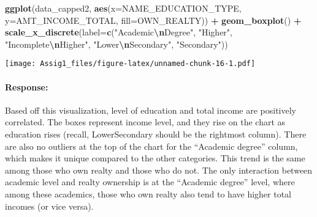 \documentclass[
]{article}
\newenvironment{Shaded}{\begin{snugshade}}{\end{snugshade}}
\newcommand{\AttributeTok}[1]{\textcolor[rgb]{0.13,0.29,0.53}{#1}}
\newcommand{\FunctionTok}[1]{\textcolor[rgb]{0.13,0.29,0.53}{\textbf{#1}}}
\newcommand{\NormalTok}[1]{#1}
\newcommand{\SpecialCharTok}[1]{\textcolor[rgb]{0.81,0.36,0.00}{\textbf{#1}}}
\newcommand{\StringTok}[1]{\textcolor[rgb]{0.31,0.60,0.02}{#1}}
\begin{document}
\begin{Shaded}
\begin{Highlighting}[]
\FunctionTok{ggplot}\NormalTok{(data\_capped2, }\FunctionTok{aes}\NormalTok{(}\AttributeTok{x=}\NormalTok{NAME\_EDUCATION\_TYPE, }\AttributeTok{y=}\NormalTok{AMT\_INCOME\_TOTAL, }\AttributeTok{fill=}\NormalTok{OWN\_REALTY)) }\SpecialCharTok{+}
  \FunctionTok{geom\_boxplot}\NormalTok{() }\SpecialCharTok{+}
  \FunctionTok{scale\_x\_discrete}\NormalTok{(}\AttributeTok{label=}\FunctionTok{c}\NormalTok{(}\StringTok{"Academic}\SpecialCharTok{\textbackslash{}n}\StringTok{Degree"}\NormalTok{, }\StringTok{"Higher"}\NormalTok{, }\StringTok{"Incomplete}\SpecialCharTok{\textbackslash{}n}\StringTok{Higher"}\NormalTok{, }\StringTok{"Lower}\SpecialCharTok{\textbackslash{}n}\StringTok{Secondary"}\NormalTok{, }\StringTok{"Secondary"}\NormalTok{))}
\end{Highlighting}
\end{Shaded}

\texttt{[image: Assig1\_files/figure-latex/unnamed-chunk-16-1.pdf]}

\hypertarget{response-2}{%
\paragraph{Response:}\label{response-2}}

\n Based off this visualization, level of education and total income are
positively correlated. The boxes represent income level, and they rise
on the chart as education rises (recall, LowerSecondary should be the
rightmost column). There are also no outliers at the top of the chart
for the ``Academic degree'' column, which makes it unique compared to
the other categories. This trend is the same among those who own realty
and those who do not. The only interaction between academic level and
realty ownership is at the ``Academic degree'' level, where among these
academics, those who own realty also tend to have higher total incomes
(or vice versa).
\end{document}
